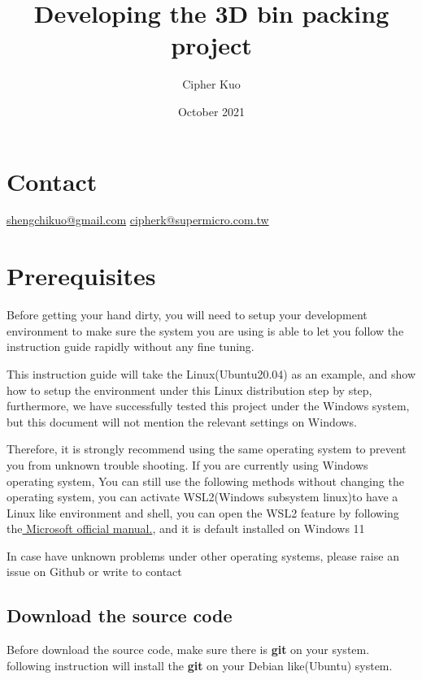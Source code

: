 \documentclass{article}
\title{Developing the 3D bin packing project}
\author{Cipher Kuo }
\date{October 2021}
\begin{document}
\maketitle
\tableofcontents
\newpage



\section{Contact}
\href{mailto:shengchikuo@gmail.com}{shengchikuo@gmail.com} 
\newline
\href{mailto:cipherk@supermicro.com.tw}{cipherk@supermicro.com.tw} 

\section{Prerequisites}
Before getting your hand dirty, 
you will need to setup your development environment to make sure the system you are using is able to let you follow the instruction guide rapidly without any fine tuning.\newline

This instruction guide will take the Linux(Ubuntu20.04) as an example, and show how to setup the environment under this Linux distribution step by step, furthermore, we have successfully tested this project under the Windows system, but this document will not mention the relevant settings on Windows.\newline


Therefore, it is strongly recommend using the same operating system to prevent you from unknown trouble shooting.
If you are currently using Windows operating system,
You can still use the following methods without changing the operating system, you can activate WSL2(Windows subsystem linux)to have a Linux like environment and shell, you can open the WSL2 feature by following the\href{https://docs.microsoft.com/en-us/windows/wsl/install}{ \color{blue}Microsoft official manual.}, and it is default installed on Windows 11 \newline

In case have unknown problems under other operating systems, please raise an issue on Github or write to contact

\subsection*{Download the source code}
Before download the source code, make sure there is \textbf{git} on your system.\newline
following instruction will install the \textbf{git} on your Debian like(Ubuntu) system.
\end{document}
